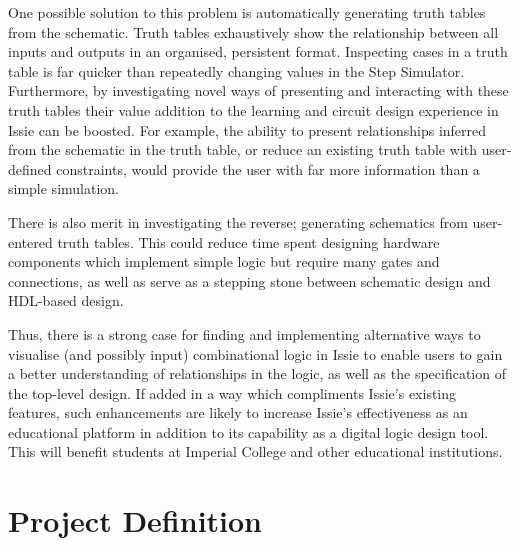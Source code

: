 One possible solution to this problem is automatically generating truth tables from the schematic. Truth tables exhaustively show the relationship between all inputs and outputs in an organised, persistent format. Inspecting cases in a truth table is far quicker than repeatedly changing values in the Step Simulator.
Furthermore, by investigating novel ways of presenting and interacting with these truth tables their value addition to the learning and circuit design experience in Issie can be boosted. For example, the ability to  present relationships inferred from the schematic in the truth table, or reduce an existing truth table with user-defined constraints, would provide the user with far more information than a simple simulation.

There is also merit in investigating the reverse; generating schematics from user-entered truth tables. This could reduce time spent designing hardware components which implement simple logic but require many gates and connections, as well as serve as a stepping stone between schematic design and HDL-based design.

Thus, there is a strong case for finding and implementing alternative ways to visualise (and possibly input) combinational logic in Issie to enable users to gain a better understanding of relationships in the logic, as well as the specification of the top-level design. If added in a way which compliments Issie's existing features, such enhancements are likely to increase Issie's effectiveness as an educational platform in addition to its capability as a digital logic design tool.
This will benefit students at Imperial College and other educational institutions.

\section{Project Definition}

